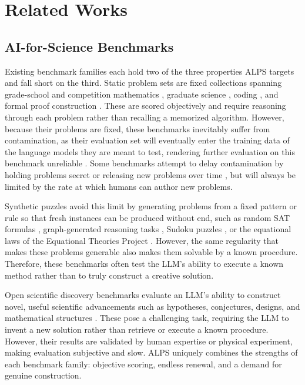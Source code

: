 \documentclass[letterpaper]{article} %
\begin{document}
\section{Related Works}

\subsection{AI-for-Science Benchmarks}

Existing benchmark families each hold two of the three properties ALPS targets and fall short on the third. Static problem sets are fixed collections spanning grade-school and competition mathematics \citep{cobbe2021training, hendrycks2021measuring}, graduate science \citep{rein2023gpqa}, coding \citep{chen2021evaluating}, and formal proof construction \citep{zheng2021minif2f, azerbayev2023proofnet, tsoukalas2024putnambench}. These are scored objectively and require reasoning through each problem rather than recalling a memorized algorithm. However, because their problems are fixed, these benchmarks inevitably suffer from contamination, as their evaluation set will eventually enter the training data of the language models they are meant to test, rendering further evaluation on this benchmark unreliable \citep{xu2024benchmark, chen2025recent}. Some benchmarks attempt to delay contamination by holding problems secret \citep{glazer2024frontiermath} or releasing new problems over time \citep{white2025livebench, jain2025livecodebench}, but will always be limited by the rate at which humans can author new problems.

Synthetic puzzles avoid this limit by generating problems from a fixed pattern or rule so that fresh instances can be produced without end, such as random SAT formulas \citep{selman1996generating}, graph-generated reasoning tasks \citep{zhu2024dyval}, Sudoku puzzles \citep{seely2025sudoku}, or the equational laws of the Equational Theories Project \citep{bolan2025equational}. However, the same regularity that makes these problems generable also makes them solvable by a known procedure. Therefore, these benchmarks often test the LLM's ability to execute a known method rather than to truly construct a creative solution. 

Open scientific discovery benchmarks evaluate an LLM's ability to construct novel, useful scientific advancements such as hypotheses, conjectures, designs, and mathematical structures \citep{lu2024ai, gottweis2026accelerating, alkan2025survey, romera2024mathematical, merchant2023scaling, jumper2021highly}. These pose a challenging task, requiring the LLM to invent a new solution rather than retrieve or execute a known procedure. However, their results are validated by human expertise or physical experiment, making evaluation subjective and slow. ALPS uniquely combines the strengths of each benchmark family: objective scoring, endless renewal, and a demand for genuine construction.
\end{document}

